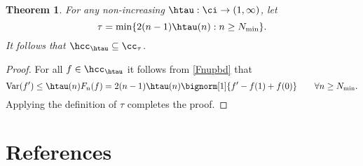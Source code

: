 \documentclass[]{elsarticle}
\DeclareMathOperator{\Var}{Var}
\newtheorem{theorem}{Theorem}
\theoremstyle{definition}
\theoremstyle{remark}
\begin{document}
\begin{theorem}  For any non-increasing $\htau: \ci \to (1,\infty)$, let  
\[
\tau = \min\{ 2(n-1) \htau(n) : n \ge  N_{\min}  \}.
\]
It follows that $\hcc_{\htau} \subseteq \cc_{\tau}$.  
\end{theorem}
\begin{proof}  For all $f \in \hcc_{\htau}$ it follows from \eqref{Fnupbd} that
\begin{equation*}
\Var(f') \le \htau(n) F_n(f) = 2(n-1) \htau(n) \bignorm[1]{f'-f(1)+f(0)} \qquad \forall n \ge N_{\min}. 
\end{equation*}
Applying the definition of $\tau$ completes the proof.
\end{proof}


\section*{References}

%

\end{document}
